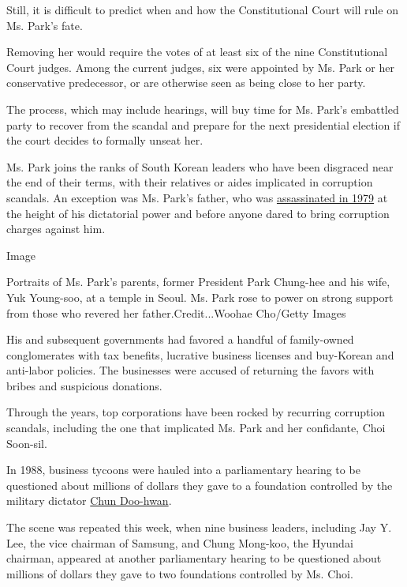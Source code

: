 Still, it is difficult to predict when and how the Constitutional Court
will rule on Ms. Park's fate.

Removing her would require the votes of at least six of the nine
Constitutional Court judges. Among the current judges, six were
appointed by Ms. Park or her conservative predecessor, or are otherwise
seen as being close to her party.

The process, which may include hearings, will buy time for Ms. Park's
embattled party to recover from the scandal and prepare for the next
presidential election if the court decides to formally unseat her.

Ms. Park joins the ranks of South Korean leaders who have been disgraced
near the end of their terms, with their relatives or aides implicated in
corruption scandals. An exception was Ms. Park's father, who was
\href{http://www.nytimes3xbfgragh.onion/1979/10/27/archives/president-park-is-slain-in-korea-by-intelligence-chief-seoul-says.html}{assassinated
in 1979} at the height of his dictatorial power and before anyone dared
to bring corruption charges against him.

Image

Portraits of Ms. Park's parents, former President Park Chung-hee and his
wife, Yuk Young-soo, at a temple in Seoul. Ms. Park rose to power on
strong support from those who revered her father.Credit...Woohae
Cho/Getty Images

His and subsequent governments had favored a handful of family-owned
conglomerates with tax benefits, lucrative business licenses and
buy-Korean and anti-labor policies. The businesses were accused of
returning the favors with bribes and suspicious donations.

Through the years, top corporations have been rocked by recurring
corruption scandals, including the one that implicated Ms. Park and her
confidante, Choi Soon-sil.

In 1988, business tycoons were hauled into a parliamentary hearing to be
questioned about millions of dollars they gave to a foundation
controlled by the military dictator
\href{http://topics.nytimes3xbfgragh.onion/top/reference/timestopics/people/c/chun_doo_hwan/index.html}{Chun
Doo-hwan}.

The scene was repeated this week, when nine business leaders, including
Jay Y. Lee, the vice chairman of Samsung, and Chung Mong-koo, the
Hyundai chairman, appeared at another parliamentary hearing to be
questioned about millions of dollars they gave to two foundations
controlled by Ms. Choi.

